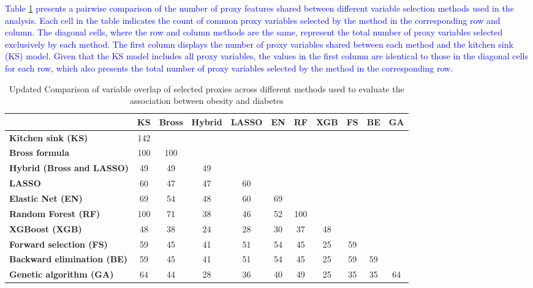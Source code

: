 \documentclass[sn-vancouver,Numbered,lineno,pdflatex]{sn-jnl}
\begin{document}
\textcolor{blue}{Table \ref{tab:method-comparison-updated} presents a pairwise comparison of the number of proxy features shared between different variable selection methods used in the analysis. Each cell in the table indicates the count of common proxy variables selected by the method in the corresponding row and column. The diagonal cells, where the row and column methods are the same, represent the total number of proxy variables selected exclusively by each method. The first column displays the number of proxy variables shared between each method and the kitchen sink (KS) model. Given that the KS model includes all proxy variables, the values in the first column are identical to those in the diagonal cells for each row, which also presents the total number of proxy variables selected by the method in the corresponding row.}

\begin{table}[htbp]
\centering
\caption{Updated Comparison of variable overlap of selected proxies across different methods used to evaluate the association between obesity and diabetes}
\label{tab:method-comparison-updated}
\begin{tabular}{lcccccccccc}
\toprule
 & \textbf{KS} & \textbf{Bross} & \textbf{Hybrid} & \textbf{LASSO} & \textbf{EN} & \textbf{RF} & \textbf{XGB} & \textbf{FS} & \textbf{BE} & \textbf{GA} \\
\midrule
\textbf{Kitchen sink (KS)} & 142 & & & & & & & & & \\
\textbf{Bross formula} & 100 & 100 & & & & & & & & \\
\textbf{Hybrid (Bross and LASSO)} & 49 & 49 & 49 & & & & & & & \\
\textbf{LASSO} & 60 & 47 & 47 & 60 & & & & & & \\
\textbf{Elastic Net (EN)} & 69 & 54 & 48 & 60 & 69 & & & & & \\
\textbf{Random Forest (RF)} & 100 & 71 & 38 & 46 & 52 & 100 & & & & \\  
\textbf{XGBoost (XGB)} & 48 & 38 & 24 & 28 & 30 & 37 & 48 & & & \\
\textbf{Forward selection (FS)} & 59 & 45 & 41 & 51 & 54 & 45 & 25 & 59 & & \\
\textbf{Backward elimination (BE)} & 59 & 45 & 41 & 51 & 54 & 45 & 25 & 59 & 59 & \\
\textbf{Genetic algorithm (GA)} & 64 & 44 & 28 & 36 & 40 & 49 & 25 & 35 & 35 & 64 \\
\bottomrule
\end{tabular}
\end{table}
\end{document}
